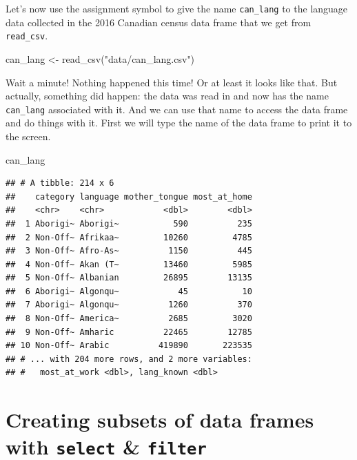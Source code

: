 \documentclass[
]{krantz}
\makeatletter
\newenvironment{Shaded}{\begin{snugshade}}{\end{snugshade}}
\newcommand{\FunctionTok}[1]{\textcolor[rgb]{0,0,0}{#1}}
\newcommand{\NormalTok}[1]{#1}
\newcommand{\OtherTok}[1]{\textcolor[rgb]{0.37,0.37,0.37}{#1}}
\newcommand{\StringTok}[1]{\textcolor[rgb]{0.5,0.5,0.5}{#1}}
\newenvironment{kframe}{%
\medskip{}
\setlength{\fboxsep}{.8em}
 \def\at@end@of@kframe{}%
 \ifinner\ifhmode%
  \def\at@end@of@kframe{\end{minipage}}%
  \begin{minipage}{\columnwidth}%
 \fi\fi%
 \def\FrameCommand##1{\hskip\@totalleftmargin \hskip-\fboxsep
 \colorbox{shadecolor}{##1}\hskip-\fboxsep
     \hskip-\linewidth \hskip-\@totalleftmargin \hskip\columnwidth}%
 \MakeFramed {\advance\hsize-\width
   \@totalleftmargin\z@ \linewidth\hsize
   \@setminipage}}%
 {\par\unskip\endMakeFramed%
 \at@end@of@kframe}
\renewenvironment{Shaded}{\begin{kframe}}{\end{kframe}}
\makeatother
\begin{document}
Let's now use the assignment symbol to give the name \texttt{can\_lang} to the language data collected in the 2016 Canadian census data frame that we get from \texttt{read\_csv}.

\begin{Shaded}
\begin{Highlighting}[]
\NormalTok{can\_lang }\OtherTok{\textless{}{-}} \FunctionTok{read\_csv}\NormalTok{(}\StringTok{"data/can\_lang.csv"}\NormalTok{)}
\end{Highlighting}
\end{Shaded}

Wait a minute! Nothing happened this time! Or at least it looks like that. But actually, something did happen: the data was read in and now has the name \texttt{can\_lang} associated with it.
And we can use that name to access the data frame and do things with it. First we will type the name of the data frame to print it to the screen.

\begin{Shaded}
\begin{Highlighting}[]
\NormalTok{can\_lang}
\end{Highlighting}
\end{Shaded}

\begin{verbatim}
## # A tibble: 214 x 6
##    category language mother_tongue most_at_home
##    <chr>    <chr>            <dbl>        <dbl>
##  1 Aborigi~ Aborigi~           590          235
##  2 Non-Off~ Afrikaa~         10260         4785
##  3 Non-Off~ Afro-As~          1150          445
##  4 Non-Off~ Akan (T~         13460         5985
##  5 Non-Off~ Albanian         26895        13135
##  6 Aborigi~ Algonqu~            45           10
##  7 Aborigi~ Algonqu~          1260          370
##  8 Non-Off~ America~          2685         3020
##  9 Non-Off~ Amharic          22465        12785
## 10 Non-Off~ Arabic          419890       223535
## # ... with 204 more rows, and 2 more variables:
## #   most_at_work <dbl>, lang_known <dbl>
\end{verbatim}

\hypertarget{creating-subsets-of-data-frames-with-select-filter}{%
\section{\texorpdfstring{Creating subsets of data frames with \texttt{select} \& \texttt{filter}}{Creating subsets of data frames with select \& filter}}\label{creating-subsets-of-data-frames-with-select-filter}}
\end{document}
